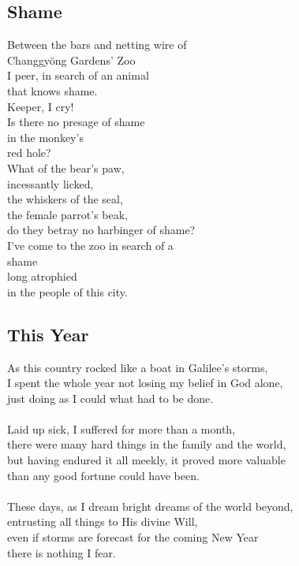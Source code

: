 \documentclass[12pt,letterpaper]{article}
\begin{document}
\begin{appendix}
\begin{subappendices}
        \subsection{Shame}
        \begin{linenumbers*}
Between the bars and netting wire of \\
Changgy\u{o}ng Gardens’ Zoo \\
I peer, in search of an animal \\
that knows shame. \\
Keeper, I cry! \\
Is there no presage of shame \\
in the monkey’s \\
red hole? \\
What of the bear’s paw, \\
incessantly licked, \\
the whiskers of the seal, \\
the female parrot’s beak, \\
do they betray no harbinger of shame? \\
I’ve come to the zoo in search of a \\
shame \\
long atrophied \\
in the people of this city. \\
        \end{linenumbers*}
        \subsection{This Year}
        \begin{linenumbers*}
As this country rocked like a boat in Galilee's storms, \\
I spent the whole year not losing my belief in God alone, \\
just doing as I could what had to be done. \\\\
Laid up sick, I suffered for more than a month, \\
there were many hard things in the family and the world, \\
but having endured it all meekly, it proved more valuable \\
than any good fortune could have been. \\\\
These days, as I dream bright dreams of the world beyond, \\
entrusting all things to His divine Will, \\
even if storms are forecast for the coming New Year \\
there is nothing I fear. \\
        \end{linenumbers*}

\end{subappendices}
\end{appendix}
\end{document}
